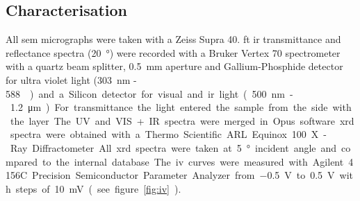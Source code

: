 \documentclass[a4paper]{article}
\newcommand{\td}[1]{\textcolor{red}{#1}}
\begin{document}
\subsection{Characterisation}
All \gls{sem} micrographs were taken with a Zeiss Supra 40. 
\Gls{ft} \gls{ir} transmittance and reflectance spectra (\SI{20}{\degree}) were recorded with a Bruker Vertex 70 
spectrometer with a quartz beam splitter, \SI{0.5}{\milli\meter} aperture and 
Gallium-Phosphide detector for ultra violet light (\SI{303}{\nano\meter} - \SI{588}
{\nano\meter}) and a Silicon detector for visual and \gls{ir} light 
(\SI{500}{\nano\meter} - \SI{1.2}{\micro\meter}). For transmittance the light
entered the sample from the side with the layer. The UV and VIS+IR spectra were merged 
in Opus software. %
\Gls{xrd} spectra were obtained with a Thermo Scientific ARL Equinox 100 X-Ray Diffractometer. 
All \gls{xrd} spectra were taken at \SI{5}{\degree} incident angle and compared to the internal database.

The \gls{iv} curves were measured with Agilent 4156C Precision Semiconductor 
Parameter Analyzer from \SI{-0.5}{\volt} to \SI{0.5}{\volt} with steps of \SI{10}{\milli\volt} (see figure \ref{fig:iv}).
\end{document}
